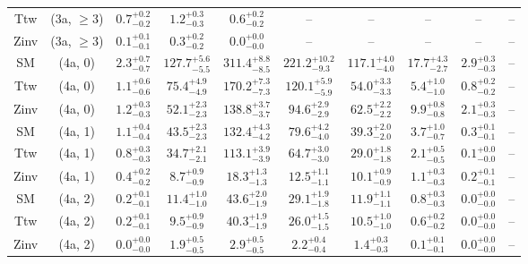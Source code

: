 \begin{table}[h!]
{\begin{tabular}{cccccccccc}
	Ttw & (3a, $\ge3$) & $0.7^{+ 0.2 }_{- 0.2 }$ & $1.2^{+ 0.3 }_{- 0.3 }$ & $0.6^{+ 0.2 }_{- 0.2 }$ & -- & -- & -- & -- & -- \\[0.5ex] 
	Zinv & (3a, $\ge3$) & $0.1^{+ 0.1 }_{- 0.1 }$ & $0.3^{+ 0.2 }_{- 0.2 }$ & $0.0^{+ 0.0 }_{- 0.0 }$ & -- & -- & -- & -- & -- \\[0.5ex] 
	SM & (4a, 0) & $2.3^{+ 0.7 }_{- 0.7 }$ & $127.7^{+ 5.6 }_{- 5.5 }$ & $311.4^{+ 8.8 }_{- 8.5 }$ & $221.2^{+ 10.2 }_{- 9.3 }$ & $117.1^{+ 4.0 }_{- 4.0 }$ & $17.7^{+ 4.3 }_{- 2.7 }$ & $2.9^{+ 0.3 }_{- 0.3 }$ & -- \\[0.5ex] 
	Ttw & (4a, 0) & $1.1^{+ 0.6 }_{- 0.6 }$ & $75.4^{+ 4.9 }_{- 4.9 }$ & $170.2^{+ 7.3 }_{- 7.3 }$ & $120.1^{+ 5.9 }_{- 5.9 }$ & $54.0^{+ 3.3 }_{- 3.3 }$ & $5.4^{+ 1.0 }_{- 1.0 }$ & $0.8^{+ 0.2 }_{- 0.2 }$ & -- \\[0.5ex] 
	Zinv & (4a, 0) & $1.2^{+ 0.3 }_{- 0.3 }$ & $52.1^{+ 2.3 }_{- 2.3 }$ & $138.8^{+ 3.7 }_{- 3.7 }$ & $94.6^{+ 2.9 }_{- 2.9 }$ & $62.5^{+ 2.2 }_{- 2.2 }$ & $9.9^{+ 0.8 }_{- 0.8 }$ & $2.1^{+ 0.3 }_{- 0.3 }$ & -- \\[0.5ex] 
	SM & (4a, 1) & $1.1^{+ 0.4 }_{- 0.4 }$ & $43.5^{+ 2.3 }_{- 2.3 }$ & $132.4^{+ 4.3 }_{- 4.2 }$ & $79.6^{+ 4.2 }_{- 4.0 }$ & $39.3^{+ 2.0 }_{- 2.0 }$ & $3.7^{+ 1.0 }_{- 0.7 }$ & $0.3^{+ 0.1 }_{- 0.1 }$ & -- \\[0.5ex] 
	Ttw & (4a, 1) & $0.8^{+ 0.3 }_{- 0.3 }$ & $34.7^{+ 2.1 }_{- 2.1 }$ & $113.1^{+ 3.9 }_{- 3.9 }$ & $64.7^{+ 3.0 }_{- 3.0 }$ & $29.0^{+ 1.8 }_{- 1.8 }$ & $2.1^{+ 0.5 }_{- 0.5 }$ & $0.1^{+ 0.0 }_{- 0.0 }$ & -- \\[0.5ex] 
	Zinv & (4a, 1) & $0.4^{+ 0.2 }_{- 0.2 }$ & $8.7^{+ 0.9 }_{- 0.9 }$ & $18.3^{+ 1.3 }_{- 1.3 }$ & $12.5^{+ 1.1 }_{- 1.1 }$ & $10.1^{+ 0.9 }_{- 0.9 }$ & $1.1^{+ 0.3 }_{- 0.3 }$ & $0.2^{+ 0.1 }_{- 0.1 }$ & -- \\[0.5ex] 
	SM & (4a, 2) & $0.2^{+ 0.1 }_{- 0.1 }$ & $11.4^{+ 1.0 }_{- 1.0 }$ & $43.6^{+ 2.0 }_{- 1.9 }$ & $29.1^{+ 1.9 }_{- 1.8 }$ & $11.9^{+ 1.1 }_{- 1.1 }$ & $0.8^{+ 0.3 }_{- 0.3 }$ & $0.0^{+ 0.0 }_{- 0.0 }$ & -- \\[0.5ex] 
	Ttw & (4a, 2) & $0.2^{+ 0.1 }_{- 0.1 }$ & $9.5^{+ 0.9 }_{- 0.9 }$ & $40.3^{+ 1.9 }_{- 1.9 }$ & $26.0^{+ 1.5 }_{- 1.5 }$ & $10.5^{+ 1.0 }_{- 1.0 }$ & $0.6^{+ 0.2 }_{- 0.2 }$ & $0.0^{+ 0.0 }_{- 0.0 }$ & -- \\[0.5ex] 
	Zinv & (4a, 2) & $0.0^{+ 0.0 }_{- 0.0 }$ & $1.9^{+ 0.5 }_{- 0.5 }$ & $2.9^{+ 0.5 }_{- 0.5 }$ & $2.2^{+ 0.4 }_{- 0.4 }$ & $1.4^{+ 0.3 }_{- 0.3 }$ & $0.1^{+ 0.1 }_{- 0.1 }$ & $0.0^{+ 0.0 }_{- 0.0 }$ & -- \\[0.5ex] 

\end{tabular}}
\end{table}
